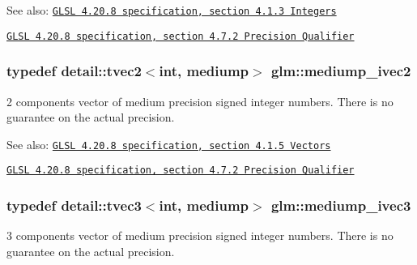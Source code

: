 \begin{Desc}
\item[See also:]\href{http://www.opengl.org/registry/doc/GLSLangSpec.4.20.8.pdf}{\tt GLSL 4.20.8 specification, section 4.1.3 Integers} 

\href{http://www.opengl.org/registry/doc/GLSLangSpec.4.20.8.pdf}{\tt GLSL 4.20.8 specification, section 4.7.2 Precision Qualifier} \end{Desc}
\hypertarget{group__core__precision_g4f1bf9844e667805235823afe809aa73}{
\subsubsection[mediump\_\-ivec2]{\setlength{\rightskip}{0pt plus 5cm}typedef detail::tvec2$<$int, mediump$>$ {\bf glm::mediump\_\-ivec2}}}
\label{group__core__precision_g4f1bf9844e667805235823afe809aa73}


2 components vector of medium precision signed integer numbers. There is no guarantee on the actual precision.

\begin{Desc}
\item[See also:]\href{http://www.opengl.org/registry/doc/GLSLangSpec.4.20.8.pdf}{\tt GLSL 4.20.8 specification, section 4.1.5 Vectors} 

\href{http://www.opengl.org/registry/doc/GLSLangSpec.4.20.8.pdf}{\tt GLSL 4.20.8 specification, section 4.7.2 Precision Qualifier} \end{Desc}
\hypertarget{group__core__precision_g520d24fa0ea887284b80a02c062ca7b8}{
\subsubsection[mediump\_\-ivec3]{\setlength{\rightskip}{0pt plus 5cm}typedef detail::tvec3$<$int, mediump$>$ {\bf glm::mediump\_\-ivec3}}}
\label{group__core__precision_g520d24fa0ea887284b80a02c062ca7b8}


3 components vector of medium precision signed integer numbers. There is no guarantee on the actual precision.

